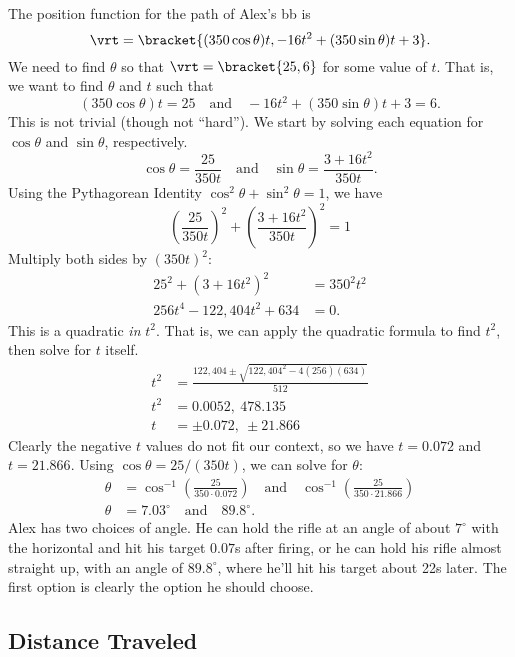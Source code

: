{The position function for the path of Alex's bb is
\[\vrt =\bracket{(350\cos \theta)t, -16t^2+(350\sin\theta)t+3}.\]
We need to find $\theta$ so that $\vrt =\bracket{25,6}$ for some value of $t$. That is, we want to find $\theta$ and $t$ such that 
\[(350\cos\theta)t = 25 \quad \text{and}\quad -16t^2+(350\sin\theta)t+3 = 6.\]
This is not trivial (though not ``hard''). We start by solving each equation for $\cos\theta$ and $\sin \theta$, respectively.
\[\cos\theta = \frac{25}{350t} \quad \text{and} \quad \sin\theta = \frac{3+16t^2}{350t}.\]
Using the Pythagorean Identity $\cos^2\theta+\sin^2\theta=1$, we have
\[\left(\frac{25}{350t}\right)^2 + \left(\frac{3+16t^2}{350t}\right)^2 =1\]
Multiply both sides by $(350t)^2$:
\begin{align*}
25^2 + (3+16t^2)^2 &=350^2t^2\\
256t^4-122,404t^2+634 &=0.
\end{align*}
This is a quadratic \emph{in} $t^2$. That is, we can apply the quadratic formula  to find $t^2$, then solve for $t$ itself.
\begin{align*}
t^2 &= \frac{122,404\pm\sqrt{122,404^2-4(256)(634)}}{512}\\
t^2 &= 0.0052,\ 478.135\\
t &=  \pm 0.072,\ \pm 21.866
\end{align*}
Clearly the negative $t$ values do not fit our context, so we have $t=0.072$ and $t=21.866$. Using $\cos \theta = 25/(350 t)$, we can solve for $\theta$:
\begin{align*}
\theta &= \cos^{-1}\left(\frac{25}{350\cdot 0.072}\right)\quad \text{and}\quad \cos^{-1}\left(\frac{25}{350\cdot 21.866}\right)\\
\theta &= 7.03^\circ \quad \text{and} \quad 89.8^\circ.
\end{align*}
Alex has two choices of angle. He can hold the rifle at an angle of about $7^\circ$ with the horizontal and hit his target $0.07$s after firing, or he can hold his rifle almost straight up, with an angle of $89.8^\circ$, where he'll hit his target about 22s later. The first option is clearly the option he should choose.}

\subsection*{Distance Traveled}

